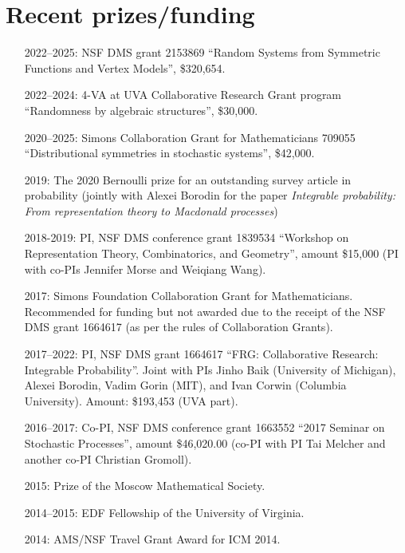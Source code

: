 \documentclass[letterpaper,11pt]{article}
\begin{document}
\section*{Recent prizes/funding}
\begin{itemize}
	\item [2022--2025:]
	NSF DMS grant 2153869 
	``Random Systems from Symmetric Functions and Vertex Models'',
	\$320,654.

	\item [2022--2024:]
	4-VA at UVA Collaborative Research Grant program
	``Randomness by algebraic structures'',
	\$30,000.
	\item [2020--2025:]
		Simons Collaboration Grant for Mathematicians 709055
		``Distributional symmetries in stochastic systems'',
		\$42,000.
	\item [2019:] 
		The 2020 Bernoulli prize for an outstanding survey article in probability 
		(jointly with Alexei Borodin for the paper \emph{Integrable probability: From representation theory to
		Macdonald processes})
	\item 
				[2018-2019:]
				PI, NSF DMS conference grant 
				1839534
				``Workshop on Representation Theory, Combinatorics, and Geometry'',
				amount \$15,000
				(PI with co-PIs Jennifer Morse and Weiqiang Wang).
	\item
	      [2017:] Simons Foundation Collaboration Grant for
	      Mathematicians. Recommended for funding but not awarded due to
	      the receipt of the NSF DMS grant 1664617 (as per the rules of Collaboration
	      Grants).
	\item
	      [2017--2022:] PI, NSF DMS grant 1664617
	      ``FRG: Collaborative Research: Integrable Probability''.
	      Joint with PIs Jinho Baik (University of Michigan), Alexei
	      Borodin, Vadim Gorin (MIT), and Ivan Corwin (Columbia University). Amount:
	      \$193,453 (UVA part).
	\item
	      [2016--2017:]
	      Co-PI, NSF DMS conference grant 1663552 ``2017 Seminar on Stochastic
	      Processes'', amount \$46,020.00 (co-PI with PI Tai Melcher and another co-PI
	      Christian Gromoll).
	\item
	      [2015:] Prize of the Moscow Mathematical Society.
	\item
	      [2014--2015:] EDF Fellowship of the University of Virginia.
	\item
	      [2014:] AMS/NSF Travel Grant Award for ICM 2014.

\end{itemize}
\end{document}
